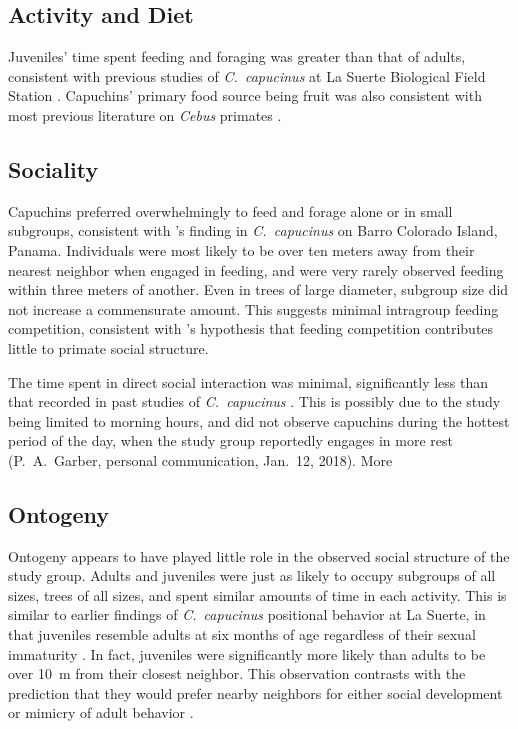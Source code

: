 \documentclass{../../../coursework}
\begin{document}
\subsection{Activity and Diet}

Juveniles' time spent feeding and foraging was greater than that of adults,
consistent with previous studies of \emph{C.~capucinus} at La Suerte
Biological Field Station \parencite{Bezanson2009}. Capuchins' primary food
source being fruit was also consistent with most previous literature on
\emph{Cebus} primates \parencite{Jack2011}.

\subsection{Sociality}

Capuchins preferred overwhelmingly to feed and forage alone or in small
subgroups, consistent with \textcite{Phillips1995}'s finding in
\emph{C.~capucinus} on Barro Colorado Island, Panama. Individuals were most
likely to be over ten meters away from their nearest neighbor when engaged in
feeding, and were very rarely observed feeding within three meters of another.
Even in trees of large diameter, subgroup size did not increase a commensurate
amount. This suggests minimal intragroup feeding competition, consistent with
\textcite{Sussman2011}'s hypothesis that feeding competition contributes
little to primate social structure.

The time spent in direct social interaction was minimal, significantly less
than that recorded in past studies of \emph{C.~capucinus}
\parencite{Sussman2005}. This is possibly due to the study being limited to
morning hours, and did not observe capuchins during the hottest period of the
day, when the study group reportedly engages in more rest (P.~A.~Garber, personal communication, Jan.~12, 2018). More 

\subsection{Ontogeny}

Ontogeny appears to have played little role in the observed social structure
of the study group. Adults and juveniles were just as likely to occupy
subgroups of all sizes, trees of all sizes, and spent similar amounts of time
in each activity. This is similar to earlier findings of \emph{C.~capucinus}
positional behavior at La Suerte, in that juveniles resemble adults at six
months of age regardless of their sexual immaturity \parencite{Bezanson2009}.
In fact, juveniles were significantly more likely than adults to be over
\SI{10}{\metre} from their closest neighbor. This observation contrasts with
the prediction that they would prefer nearby neighbors for either social
development \parencite{Strier2007} or mimicry of adult behavior \parencite{Sherrow2011}.
\end{document}
